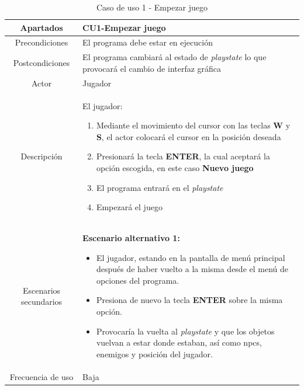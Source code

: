 \documentclass[a4paper]{article}
\begin{document}
\begin{table}[!ht]
    \centering
    \begin{tabular}{|c|p{12cm}|}
        \hline
        \textbf{Apartados}     & \textbf{CU1-Empezar juego}                                                                                                             \\
        \hline
        Precondiciones         & El programa debe estar en ejecución                                                                                                    \\
        \hline
        Postcondiciones        & El programa cambiará al estado de \textit{playstate} lo que provocará el cambio de interfaz gráfica                                    \\
        \hline
        Actor                  & Jugador                                                                                                                                \\
        \hline
        Descripción            & El jugador:
        \begin{enumerate}
            \item Mediante el movimiento del cursor con las teclas \textbf{W} y \textbf{S}, el actor colocará el cursor en la posición deseada
            \item Presionará la tecla \textbf{ENTER}, la cual aceptará la opción escogida, en este caso \textbf{Nuevo juego}
            \item El programa entrará en el \textit{playstate}
            \item Empezará el juego
        \end{enumerate}                               \\
        \hline
        Escenarios secundarios & \textbf{Escenario alternativo 1:}
        \begin{itemize}
            \item El jugador, estando en la pantalla de menú principal después de haber vuelto a la misma desde el menú de opciones del programa.
            \item Presiona de nuevo la tecla \textbf{ENTER} sobre la misma opción.
            \item[\faAngleRight] Provocaría la vuelta al \textit{playstate} y que los objetos vuelvan a estar donde estaban, así como npcs, enemigos y posición del jugador.
        \end{itemize} \\
        \hline
        Frecuencia de uso      & Baja                                                                                                                                   \\
        \hline
    \end{tabular}
    \caption{Caso de uso 1 - Empezar juego}
    \label{tab:casosdeuso01-table}
\end{table}
\end{document}
